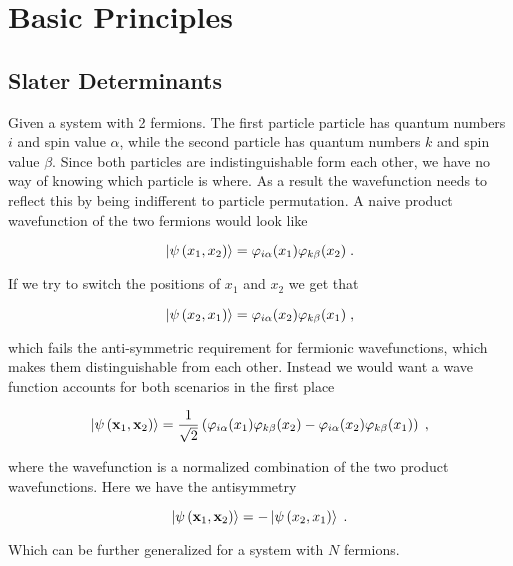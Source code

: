 \section{Basic Principles}
\subsection{Slater Determinants}

Given a system with 2 fermions. The first particle particle has quantum numbers $i$ and spin value $\alpha$, while the second particle has quantum numbers $k$ and spin value $\beta$. Since both particles are indistinguishable form each other, we have no way of knowing which particle is where. As a result the wavefunction needs to reflect this by being indifferent to particle permutation. A naive product wavefunction of the two fermions would look like

\begin{equation}
    \ket{\psi\left ( x_1, x_2 \right )} = \varphi_{i\alpha} (x_1)\varphi_{k\beta}(x_2) \; .
\end{equation}

If we try to switch the positions of $x_1$ and $x_2$ we get that

\begin{equation}
    \ket{\psi\left ( x_2, x_1 \right )} = \varphi_{i\alpha} (x_2)\varphi_{k\beta}(x_1) \; ,
\end{equation}

which fails the anti-symmetric requirement for fermionic wavefunctions, which makes them distinguishable from each other. Instead we would want a wave function accounts for both scenarios in the first place

\begin{equation}
    \ket{\psi\left ( \mathbf{x}_1, \mathbf{x}_2 \right )} = \frac{1}{\sqrt{2}} \left ( \varphi_{i\alpha} (x_1)\varphi_{k\beta}(x_2) - \varphi_{i\alpha} (x_2)\varphi_{k\beta}(x_1)\right ) \; ,
\end{equation}

where the wavefunction is a normalized combination of the two product wavefunctions. Here we have the antisymmetry

\begin{equation}
    \ket{\psi\left ( \mathbf{x}_1, \mathbf{x}_2 \right )} = - \ket{\psi\left ( x_2, x_1 \right )} \; .
\end{equation}

Which can be further generalized for a system with $N$ fermions. 

